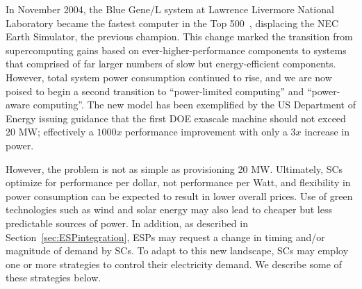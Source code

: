 In November 2004, the Blue Gene/L system at Lawrence Livermore National Laboratory
became the fastest computer in the Top 500~\cite{Top500}, displacing the NEC Earth Simulator,
the previous champion. This change marked the transition from supercomputing gains based
on ever-higher-performance components to systems that comprised of far larger numbers of 
slow but energy-efficient components. However, total system power consumption continued to rise,
and we are now poised to begin a second transition to ``power-limited computing'' and ``power-aware computing''. The new
model has been exemplified by the US Department of Energy issuing guidance that the first
DOE exascale machine should not exceed 20 MW; effectively a $1000x$ performance improvement
with only a $3x$ increase in power. 

However, the problem is not as simple as provisioning 20 MW. Ultimately, SCs optimize for
performance per dollar, not performance per Watt, and flexibility in power consumption
can be expected to result in lower overall prices. Use of green technologies such as
wind and solar energy may also lead to cheaper but less predictable sources of power.
In addition, as described in Section~\ref{sec:ESPintegration}, ESPs may request a change in timing and/or magnitude of demand by SCs. To adapt to this new landscape, SCs may employ one or more strategies to control their electricity demand. We describe some of these strategies below. 

